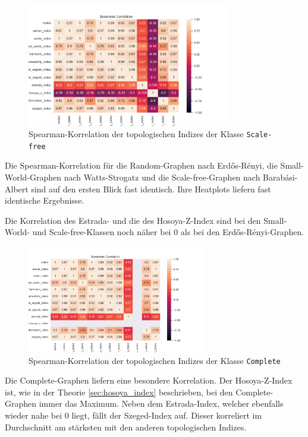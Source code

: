 \begin{figure}[H]
    \centering
    \includegraphics[width=0.8\textwidth]{images/30_results/scalefree-correlation.png}
    \caption{Spearman-Korrelation der topologischen Indizes der Klasse \texttt{Scale-free}}
    \label{fig:correlation-scalefree}
\end{figure}

Die Spearman-Korrelation für die Random-Graphen nach Erdős-Rényi, die Small-World-Graphen nach Watts-Strogatz und die Scale-free-Graphen nach Barabási-Albert sind auf den ersten Blick fast identisch. Ihre Heatplots liefern fast identische Ergebnisse.

Die Korrelation des Estrada- und die des Hosoya-Z-Index sind bei den Small-World- und Scale-free-Klassen noch näher bei $ 0 $ als bei den Erdős-Rényi-Graphen.

\begin{figure}[H]
    \centering
    \includegraphics[width=0.7\textwidth]{images/30_results/complete-correlation.png}
    \caption{Spearman-Korrelation der topologischen Indizes der Klasse \texttt{Complete}}
    \label{fig:correlation-complete}
\end{figure}

Die Complete-Graphen liefern eine besondere Korrelation. Der Hosoya-Z-Index ist, wie in der Theorie \ref{sec:hosoya_index} beschrieben, bei den Complete-Graphen immer das Maximum.
Neben dem Estrada-Index, welcher ebenfalls wieder nahe bei $ 0 $ liegt, fällt der Szeged-Index auf. Dieser korreliert im Durchschnitt am stärksten mit den anderen topologischen Indizes.

